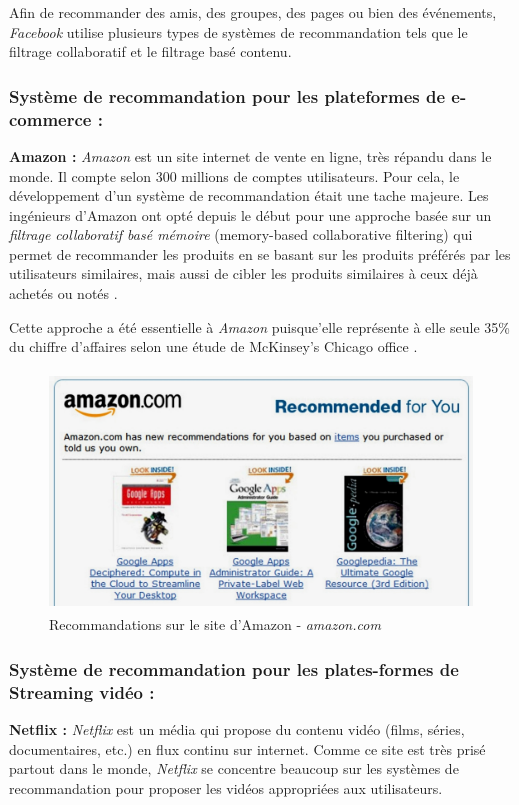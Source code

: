 Afin de recommander des amis, des groupes, des pages ou bien des événements, \emph{Facebook} utilise plusieurs types de systèmes de recommandation tels que le filtrage collaboratif et le filtrage basé contenu.

\subsubsection{Système de recommandation pour les plateformes de e-commerce :}

\textbf{Amazon :} \emph{Amazon} est un site internet de vente en ligne, très répandu dans le monde. Il compte selon \cite{refamazonus} 300 millions de comptes utilisateurs. Pour cela, le développement d'un système de recommandation était une tache majeure. Les ingénieurs d'Amazon ont opté depuis le début pour une approche basée sur un \emph{filtrage collaboratif basé mémoire} (memory-based collaborative filtering) qui permet de recommander les produits en se basant sur les produits préférés par les utilisateurs similaires, mais aussi de cibler les produits similaires à ceux déjà achetés ou notés \cite{amazon}. 

Cette approche a été essentielle à \emph{Amazon} puisque'elle représente à elle seule 35\% du chiffre d'affaires selon une étude de McKinsey's Chicago office \cite{McKinsey}.
\begin{figure}[H]
    \centering
    \includegraphics[height=180pt,width=350pt]{img/chapter1/amazon.jpg}
    \caption{Recommandations sur le site d'Amazon - \emph{amazon.com}}
\end{figure}

\subsubsection{Système de recommandation pour les plates-formes de Streaming vidéo :}
\textbf{Netflix :} \emph{Netflix} est un média qui propose du contenu vidéo (films, séries, documentaires, etc.) en flux continu sur internet. Comme ce site est très prisé partout dans le monde, \emph{Netflix} se concentre beaucoup sur les systèmes de recommandation pour proposer les vidéos appropriées aux utilisateurs.

